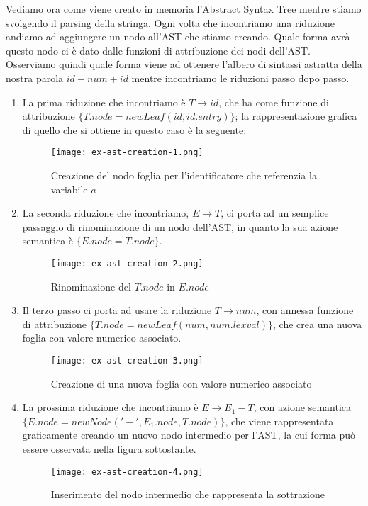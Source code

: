 \documentclass[class=book, crop=false, oneside, 12pt]{standalone}
\begin{document}
Vediamo ora come viene creato in memoria l'Abstract Syntax Tree mentre stiamo svolgendo il parsing della stringa.
Ogni volta che incontriamo una riduzione andiamo ad aggiungere un nodo all'AST che stiamo creando. Quale forma avrà questo nodo ci è dato dalle funzioni di attribuzione dei nodi dell'AST.
Osserviamo quindi quale forma viene ad ottenere l'albero di sintassi astratta della nostra parola \(id-num+id\) mentre incontriamo le riduzioni passo dopo passo.
\begin{enumerate}
    \item La prima riduzione che incontriamo è \(T \to id\), che ha come funzione di attribuzione \(\{T.node = newLeaf(id, id.entry)\}\); la rappresentazione grafica di quello che si ottiene in questo caso è la seguente:
    \begin{figure}[H]
        \centering
        \texttt{[image: ex-ast-creation-1.png]}
        \caption{Creazione del nodo foglia per l'identificatore che referenzia la variabile \(a\)}
    \end{figure}
    \item La seconda riduzione che incontriamo, \(E \to T\), ci porta ad un semplice passaggio di rinominazione di un nodo dell'AST, in quanto la sua azione semantica è \(\{E.node = T.node\}\).
    \begin{figure}[H]
        \centering
        \texttt{[image: ex-ast-creation-2.png]}
        \caption{Rinominazione del \(T.node\) in \(E.node\)}
    \end{figure} 
    \item Il terzo passo ci porta ad usare la riduzione \(T \to num\), con annessa funzione di attribuzione \(\{T.node = newLeaf(num, num.lexval)\}\), che crea una nuova foglia con valore numerico associato.
    \begin{figure}[H]
        \centering
        \texttt{[image: ex-ast-creation-3.png]}
        \caption{Creazione di una nuova foglia con valore numerico associato}
    \end{figure} 
    \item La prossima riduzione che incontriamo è \(E \to E_1 - T\), con azione semantica \(\{E.node = newNode('-', E_1.node, T.node)\}\), che viene rappresentata graficamente creando un nuovo nodo intermedio per l'AST, la cui forma può essere osservata nella figura sottostante.
    \begin{figure}[H]
        \centering
        \texttt{[image: ex-ast-creation-4.png]}
        \caption{Inserimento del nodo intermedio che rappresenta la sottrazione}

\end{figure}
\end{enumerate}
\end{document}
